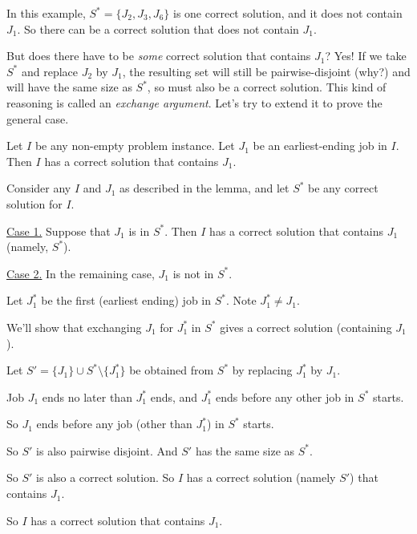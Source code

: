 In this example, $S^* = \{J_2, J_3, J_6\}$ is one correct solution, and it does not contain $J_1$.
So there can be a correct solution that does not contain $J_1$.

But does there have to be \emph{some} correct solution that contains $J_1$?
Yes!  If we take $S^*$ and replace $J_2$ by $J_1$, the resulting set will still be pairwise-disjoint (why?)
and will have the same size as $S^*$, so must also be a correct solution.
This kind of reasoning is called an \emph{exchange argument}.
Let's try to extend it to prove the general case.

\begin{lemma}\label{greedy: activity selection: first}
  Let $I$ be any non-empty problem instance.  Let $J_1$ be an earliest-ending job in $I$.
  Then $I$ has a correct solution that contains $J_1$.
\end{lemma}
\begin{longFormProof}
  \step Consider any $I$ and $J_1$ as described in the lemma, and let $S^*$ be any correct solution for $I$.  

  \begin{block}
    \step \underline{Case 1.}  Suppose that $J_1$ is in $S^*$.
    \step Then $I$ has a correct solution that contains $J_1$ (namely, $S^*$).
  \end{block}
  
  \begin{block}
    \step \underline{Case 2.}  In the remaining case, $J_1$ is not in $S^*$.

    \step Let $J_1^*$ be the first (earliest ending) job in $S^*$.  Note $J_1^* \ne J_1$.

    \step We'll show that exchanging $J_1$ for $J_1^*$ in $S^*$ gives a correct solution (containing $J_1$).

    \step Let $S' = \{J_1\}\cup S^* \setminus \{J^*_1\}$ be obtained from $S^*$ by replacing $J^*_1$ by $J_1$.

    \step Job $J_1$ ends no later than $J^*_1$ ends, and $J^*_1$ ends before any other job in $S^*$ starts.
    
    \step So $J_1$ ends before any job (other than $J^*_1$) in $S^*$ starts.

    \step So $S'$ is also pairwise disjoint.  And $S'$ has the same size as $S^*$.

    \step So $S'$ is also a correct solution. So $I$ has a correct solution (namely $S'$) that contains $J_1$.
  \end{block}
  \step So $I$ has a correct solution that contains $J_1$.
\end{longFormProof}

